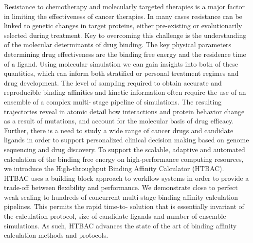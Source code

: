 Resistance to chemotherapy and molecularly targeted therapies is a major
factor in limiting the effectiveness of cancer therapies. In many cases
resistance can be linked to genetic changes in target proteins, either 
pre-existing or evolutionarily selected during treatment. Key to overcoming this
challenge is the understanding of the molecular determinants of drug binding.
The key physical parameters determining drug effectiveness are the binding
free energy and the residence time of a ligand. Using molecular simulation we
can gain insights into both of these quantities, which can inform both
stratified or personal treatment regimes and drug development. The level of
sampling required to obtain accurate and reproducible binding affinities and
kinetic information often require the use of an ensemble of a complex multi-
stage pipeline of simulations. The resulting trajectories reveal in atomic
detail how interactions and protein behavior change as a result of mutations,
and account for the molecular basis of drug efficacy. Further, there is a need
to study a wide range of cancer drugs and candidate ligands in order to
support personalized clinical decision making based on genome sequencing and
drug discovery. To support the scalable, adaptive and automated calculation of
the binding free energy on high-performance computing resources, we introduce
the High-throughput Binding Affinity Calculator (HTBAC). HTBAC uses a building
block approach to workflow systems in order to provide a trade-off between
flexibility and performance. We demonstrate close to perfect weak scaling to
hundreds of concurrent multi-stage binding affinity calculation pipelines.
This permits the rapid time-to- solution that is essentially invariant of the
calculation protocol, size of candidate ligands and number of ensemble
simulations. As such, HTBAC advances the state of the art of binding affinity
calculation methods and protocols.







